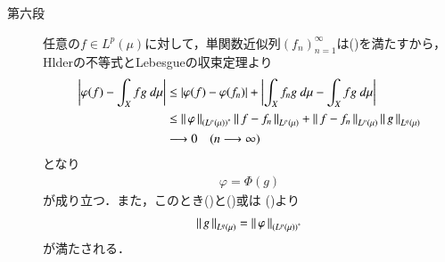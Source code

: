 \begin{prf}
\begin{description}
			\item[第六段]
				任意の$f \in L^p(\mu)$に対して，単関数近似列$(f_n)_{n=1}^\infty$は()を満たすから，
				Hlderの不等式とLebesgueの収束定理より
				\begin{align}
					\left| \varphi(f) - \int_X fg\ d\mu \right|
					&\leq \left| \varphi(f) - \varphi(f_n) \right| + \left| \int_X f_ng\ d\mu - \int_X fg\ d\mu \right| \\
					&\leq \left\|\, \varphi\, \right\|_{\left( L^p(\mu) \right)^*} \left\|\, f - f_n\, \right\|_{L^p(\mu)}
						+ \left\|\, f - f_n\, \right\|_{L^p(\mu)}\left\|\, g\, \right\|_{L^q(\mu)} \\
					&\longrightarrow 0 \quad (n \longrightarrow \infty)
				\end{align}
				となり
				\begin{align}
					\varphi = \Phi(g)
				\end{align}
				が成り立つ．また，このとき()と()或は
				()より
				\begin{align}
					\left\|\, g\, \right\|_{L^q(\mu)} = \left\|\, \varphi\, \right\|_{\left( L^p(\mu) \right)^*}
				\end{align}
				が満たされる．
				

\end{description}
\end{prf}
